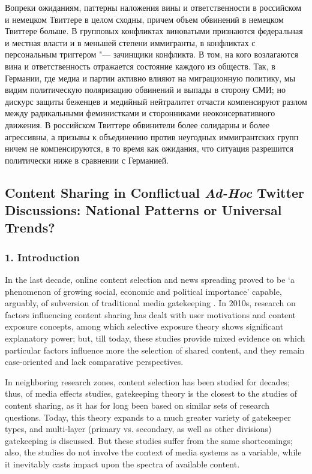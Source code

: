 Вопреки ожиданиям, паттерны наложения вины и ответственности в российском и немецком Твиттере в целом сходны, причем объем обвинений в немецком Твиттере больше. В групповых конфликтах виноватыми признаются федеральная и местная власти и в меньшей степени иммигранты, в конфликтах с персональным триггером "--- зачинщики конфликта. В том, на кого возлагаются вина и ответственность отражается состояние каждого из обществ. Так, в Германии, где медиа и партии активно влияют на миграционную политику, мы видим политическую поляризацию обвинений и выпады в сторону СМИ; но дискурс защиты беженцев и медийный нейтралитет отчасти компенсируют разлом между радикальными феминистками и сторонниками неоконсервативного движения. В российском Твиттере обвинители более солидарны и более агрессивны, а призывы к объединению против неугодных иммигрантских групп ничем не компенсируются, в то время как ожидания, что ситуация разрешится политически ниже в сравнении с Германией.

\subsection{Content Sharing in Conflictual \textit{Ad-Hoc} Twitter Discussions: National Patterns or Universal Trends?}\label{subsec:ch2/sec5/sub2}

\subsubsection{1. Introduction}

In the last decade, online content selection and news spreading proved to be ‘a phenomenon of growing social, economic and political importance’ \cite[p.~331]{LeeMa} capable, arguably, of subversion of traditional media gatekeeping \cite{Carr}. In 2010s, research on factors influencing content sharing has dealt with user motivations and content exposure concepts, among which selective exposure theory shows significant explanatory power; but, till today, these studies provide mixed evidence on which particular factors influence more the selection of shared content, and they remain case-oriented and lack comparative perspectives.

In neighboring research zones, content selection has been studied for decades; thus, of media effects studies, gatekeeping theory is the closest to the studies of content sharing, as it has for long been based on similar sets of research questions. Today, this theory expands to a much greater variety of gatekeeper types, and multi-layer (primary vs. secondary, as well as other divisions) gatekeeping is discussed. But these studies suffer from the same shortcomings; also, the studies do not involve the context of media systems as a variable, while it inevitably casts impact upon the spectra of available content.

